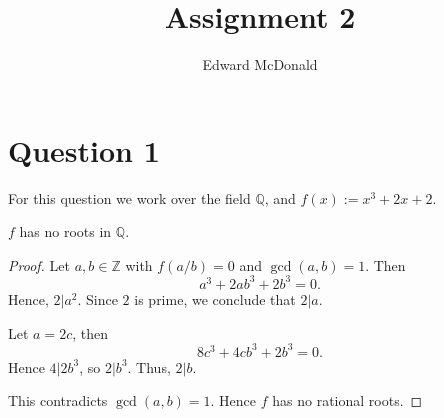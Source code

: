 \documentclass{unswmaths}
\begin{document}
\subject{Galois Theory}
\author{Edward McDonald}
\title{Assignment 2}
\setlength\parindent{0pt}
\newcommand{\Intgr}{\mathbb{Z}}
\newcommand{\Aut}{\operatorname{Aut}}
\newcommand{\isom}{\sim}
\newcommand{\Rat}{\mathbb{Q}}
\newcommand{\id}{\operatorname{id}}

\unswtitle{}

\section*{Question 1}

For this question we work over the field $\Rat$,
and $f(x) := x^3+2x+2$.
\begin{lemma}
    $f$ has no roots in $\Rat$.
\end{lemma}
\begin{proof}
    Let $a,b \in \Intgr$ with $f(a/b) = 0$ and $\gcd(a,b) = 1$. Then
    \begin{equation*}
        a^3+2ab^3+2b^3 = 0.
    \end{equation*}
    Hence, $2|a^2$. Since $2$ is prime, we conclude that $2|a$.
    
    Let $a = 2c$, then
    \begin{equation*}
        8c^3+4cb^3+2b^3 = 0.
    \end{equation*}
    Hence $4|2b^3$, so $2|b^3$. Thus, $2|b$.
    
    This contradicts $\gcd(a,b) = 1$. Hence $f$
    has no rational roots.    
\end{proof}
\end{document}
